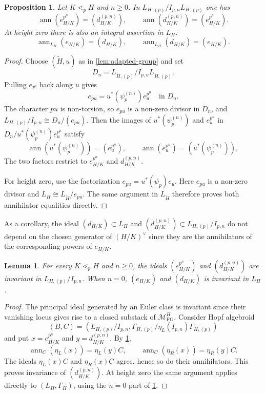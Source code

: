 \documentclass[11pt,reqno]{amsart}
\newtheorem{proposition}[proposition]{Proposition}
\newtheorem{lemma}[lemma]{Lemma}
\newcommand{\ann}{\operatorname{ann}}
\newcommand{\MFG}{\mathcal M_{\mathrm{FG}}}
\begin{document}
\begin{proposition}\label{prop:universal-edge}
Let $K\lessdot_p H$ and $n\geq0$.  In
$L_{H,(p)}/I_{p,n}L_{H,(p)}$ one has
\[
  \ann(e_{H/K}^{p^n})=(d_{H/K}^{(p,n)}), \qquad \ann(d_{H/K}^{(p,n)})=(e_{H/K}^{p^n}).
\]
At height zero there is also an integral assertion in $L_H$:
\[
 \ann_{L_H}(e_{H/K})=(d_{H/K}),
 \qquad
 \ann_{L_H}(d_{H/K})=(e_{H/K}).
\]
\end{proposition}
\begin{proof}
Choose $(\widetilde H,u)$ as in \cref{lem:adapted-group} and set
\[
 D_n=L_{\widetilde H,(p)}/I_{p,n}L_{\widetilde H,(p)}.
\]
Pulling $e_{\tau^p}$ back along $u$ gives
\[
 e_{pu}=u^*(\psi_p^{(n)})e_u^{p^n}
 \quad\text{in }D_n.
\]
The character $pu$ is non-torsion, so $e_{pu}$ is a non-zero divisor in $D_n$, and $L_{H,(p)}/I_{p,n}\cong D_n/(e_{pu})$. 
Then the images of $u^*(\psi_p^{(n)})$ and $e_u^{p^n}$ in $D_n/u^*(\psi_p^{(n)})e_u^{p^n}$ satisfy
\[
 \ann(\bar u^*(\psi_p^{(n)}))=(\bar e_u^{p^n}),
 \qquad
 \ann(\bar e_u^{p^n})=(\bar u^*(\psi_p^{(n)})),
\]
The two factors restrict to $e_{H/K}^{p^n}$ and $d_{H/K}^{(p,n)}$. 

For height zero, use the factorization
$e_{pu}=u^*(\psi_p)e_u$. Here $e_{pu}$ is a non-zero divisor and $L_H\cong L_{\widetilde H}/e_{pu}$. The same argument in $L_{\widetilde H}$ therefore proves both annihilator equalities directly.
\end{proof}

As a corollary, the ideal $(d_{H/K})\subset L_H$ and $(d_{H/K}^{(p,n)})\subset L_{H,(p)}/I_{p,n}$ do not depend on the chosen generator of $(H/K)^\vee$ since they are the annihilators of the corresponding powers of $e_{H/K}$. 


\begin{lemma}\label{prop:d-invariant}
For every $K\lessdot_p H$ and $n\geq0$, the ideals $(e_{H/K}^{p^n})$ and $(d_{H/K}^{(p,n)})$ are invariant in $L_{H,(p)}/I_{p,n}$.  When $n=0$, $(e_{H/K})$ and $(d_{H/K})$ is invariant in $L_H$.
\end{lemma}
\begin{proof}
  The principal ideal generated by an Euler class is invariant since their vanishing locus gives rise to a closed substack of $\MFG^H$. Consider Hopf algebroid $$(B,C)=(L_{H,(p)}/I_{p,n},\Gamma_{H,(p)}/\eta_L(I_{p,n})\Gamma_{H,(p)})$$ and put $x=e_{H/K}^{p^n}$ and $y=d_{H/K}^{(p,n)}$.  By \cref{prop:universal-edge},
  \[
  \ann_C(\eta_L(x))=\eta_L(y)C, \qquad \ann_C(\eta_R(x))=\eta_R(y)C.
  \]
  The ideals $\eta_L(x)C$ and $\eta_R(x)C$ agree, hence so do their annihilators.  This proves invariance of $(d_{H/K}^{(p,n)})$.  At height zero the same argument applies directly to $(L_H,\Gamma_H)$, using the $n=0$ part of \cref{prop:universal-edge}.
\end{proof}
\end{document}
